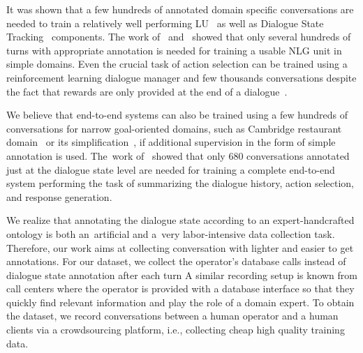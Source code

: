 \documentclass[runningheads,a4paper]{llncs}
\def\OD#1{{\color{darkgreen}OD: \it #1}}
\begin{document}
It was shown that a few hundreds of annotated domain specific conversations are needed to train a relatively well performing LU~\cite{jurvcivcek2014factored} as well as Dialogue State Tracking~\cite{young2010hidden} components.
The work of~\cite{duvsek2016sequence} and~\cite{mairesse2010phrase} showed that only several hundreds of turns with appropriate annotation is needed for training a usable NLG unit in simple domains.
Even the crucial task of action selection can be trained using a reinforcement learning dialogue manager and few thousands conversations despite the fact that rewards are only provided at the end of a dialogue~\cite{gasic2011line}.

We believe that end-to-end systems can also be trained using a few hundreds of conversations for narrow goal-oriented domains, such as Cambridge restaurant domain~\cite{henderson2014dstc2} or its simplification~\cite{wen2016network}, if additional supervision in the form of simple annotation is used.
The~work of~\cite{wen2016network} showed that only 680 conversations annotated just at the dialogue state level are needed for training a complete end-to-end system performing the task of summarizing the dialogue history, action selection, and response generation.

We realize that annotating the dialogue state according to an expert-handcrafted ontology is both an~artificial and a~very labor-intensive data collection task. 
Therefore, our work aims at collecting conversation with lighter and easier to get annotations.
For our dataset, we collect the operator's database calls instead of dialogue state annotation after each turn
A similar recording setup is known from call centers where the operator is provided with a database interface so that they quickly find relevant information and play the role of a domain expert.
To obtain the dataset, we record conversations between a human operator and a human clients via a crowdsourcing platform, i.e., collecting cheap high quality training data.
\end{document}
